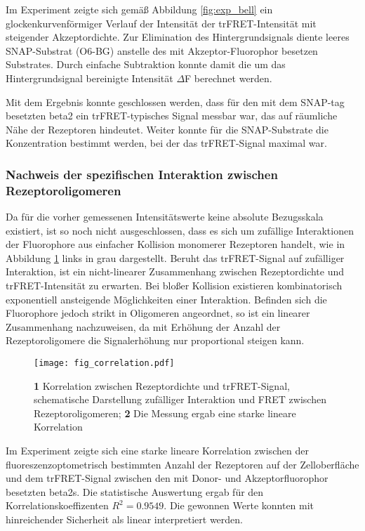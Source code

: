 Im Experiment zeigte sich gemäß Abbildung \ref{fig:exp_bell} ein glockenkurvenförmiger Verlauf der Intensität der trFRET-Intensität mit steigender Akzeptordichte. Zur Elimination des Hintergrundsignals diente leeres SNAP-Substrat (O6-BG) anstelle des mit Akzeptor-Fluorophor besetzen Substrates. Durch einfache Subtraktion konnte damit die um das Hintergrundsignal bereinigte Intensität $\Delta$F berechnet werden. 

Mit dem Ergebnis konnte geschlossen werden, dass für den mit dem SNAP-tag besetzten \gls{beta2} ein trFRET-typisches Signal messbar war, das auf räumliche Nähe der Rezeptoren hindeutet. Weiter konnte für die SNAP-Substrate die Konzentration bestimmt werden, bei der das trFRET-Signal maximal war. 

\subsubsection{Nachweis der spezifischen Interaktion zwischen Rezeptoroligomeren}

Da für die vorher gemessenen Intensitätswerte keine absolute Bezugsskala existiert, ist so noch nicht ausgeschlossen, dass es sich um zufällige Interaktionen der Fluorophore aus einfacher Kollision monomerer Rezeptoren handelt, wie in Abbildung \ref{fig:correlation} links in grau dargestellt. Beruht das trFRET-Signal auf zufälliger Interaktion, ist ein nicht-linearer Zusammenhang zwischen Rezeptordichte und trFRET-Intensität zu erwarten. Bei bloßer Kollision existieren kombinatorisch exponentiell ansteigende Möglichkeiten einer Interaktion.  Befinden sich die Fluorophore jedoch strikt in Oligomeren angeordnet, so ist ein linearer Zusammenhang nachzuweisen, da mit Erhöhung der Anzahl der Rezeptoroligomere die Signalerhöhung nur proportional steigen kann.

\begin{figure}[H]
	\centering
    \texttt{[image: fig\_correlation.pdf]}
    \caption{\textbf{1} Korrelation zwischen Rezeptordichte und trFRET-Signal, schematische Darstellung zufälliger Interaktion und FRET zwischen Rezeptoroligomeren; \textbf{2} Die Messung ergab eine starke lineare Korrelation} 
    \label{fig:correlation}
\end{figure}

Im Experiment zeigte sich eine starke lineare Korrelation zwischen der fluoreszenzoptometrisch bestimmten Anzahl der Rezeptoren auf der Zelloberfläche und dem trFRET-Signal zwischen den mit Donor- und Akzeptorfluorophor besetzten \gls{beta2}s. Die statistische Auswertung ergab für den Korrelationskoeffizenten $R^2=0.9549$. Die gewonnen Werte konnten mit hinreichender Sicherheit als linear interpretiert werden.

